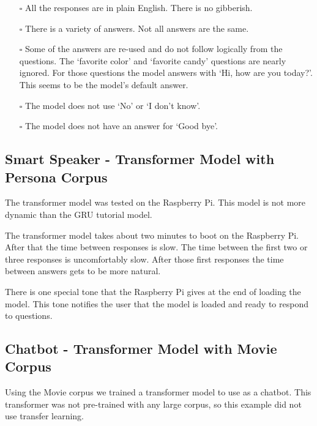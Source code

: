 \begin{itemize}
	
	\item[\rlap{\raisebox{0.3ex}{\hspace{0.4ex}\scriptsize \ding{52}}}$\square$] All the responses are in plain English. There is no gibberish.
	
	\item[\rlap{\raisebox{0.3ex}{\hspace{0.4ex}\scriptsize \ding{52}}}$\square$] There is a variety of answers. Not all answers are the same.
	
	\item[\rlap{\raisebox{0.3ex}{\hspace{0.4ex}\scriptsize \ding{56}}}$\square$] Some of the answers are re-used and do not follow logically from the questions. The `favorite color' and `favorite candy' questions are nearly ignored. For those questions the model answers with `Hi, how are you today?'. This seems to be the model's default answer.
	
	\item[\rlap{\raisebox{0.3ex}{\hspace{0.4ex}\scriptsize \ding{52}}}$\square$] The model does not use `No' or `I don't know'.
	
	\item[\rlap{\raisebox{0.3ex}{\hspace{0.4ex}\scriptsize \ding{56}}}$\square$] The model does not have an answer for `Good bye'.
\end{itemize}


\subsection{Smart Speaker - Transformer Model with Persona Corpus}

The transformer model was tested on the Raspberry Pi. This model is not more dynamic than the GRU tutorial model. 

The transformer model takes about two minutes to boot on the Raspberry Pi. After that the time between responses is slow. The time between the first two or three responses is uncomfortably slow. After those first responses the time between answers gets to be more natural.

There is one special tone that the Raspberry Pi gives at the end of loading the model. This tone notifies the user that the model is loaded and ready to respond to questions.


\subsection{Chatbot - Transformer Model with Movie Corpus}
Using the Movie corpus we trained a transformer model to use as a chatbot. This transformer was not pre-trained with any large corpus, so this example did not use transfer learning. 

